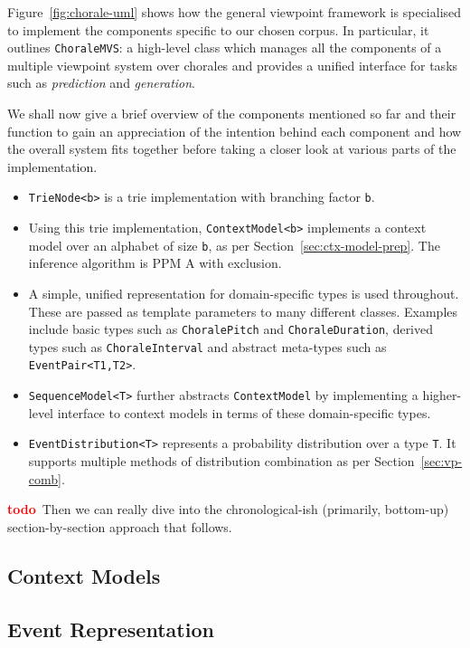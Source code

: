 \documentclass[12pt,a4paper,twoside,openright]{report}
\newcommand{\todo}{\textcolor{red}{\textbf{todo}~}}
\begin{document}
Figure~\ref{fig:chorale-uml} shows how the general viewpoint framework is
specialised to implement the components specific to our chosen corpus. In
particular, it outlines \texttt{ChoraleMVS}: a high-level class which manages
all the components of a multiple viewpoint system over chorales and provides a
unified interface for tasks such as \emph{prediction} and \emph{generation}.

We shall now give a brief overview of the components mentioned so far and their
function to gain an appreciation of the intention behind each component and how
the overall system fits together before taking a closer look at various parts of
the implementation.

\begin{itemize}
  \item \texttt{TrieNode<b>} is a trie implementation with branching factor
    \texttt{b}.
  \item Using this trie implementation, \texttt{ContextModel<b>} implements a
    context model over an alphabet of size \texttt{b}, as per
    Section~\ref{sec:ctx-model-prep}. The inference algorithm is PPM A with
    exclusion.
  \item A simple, unified representation for domain-specific types is used
    throughout.  These are passed as template parameters to many different
    classes. Examples include basic types such as \texttt{ChoralePitch} and
    \texttt{ChoraleDuration}, derived types such as \texttt{ChoraleInterval} and
    abstract meta-types such as \texttt{EventPair<T1,T2>}.
    
  \item \texttt{SequenceModel<T>} further abstracts \texttt{ContextModel} by
    implementing a higher-level interface to context models in terms of these
    domain-specific types.
  \item \texttt{EventDistribution<T>} represents a probability distribution over
    a type \texttt{T}. It supports multiple methods of distribution combination
    as per Section~\ref{sec:vp-comb}.
\end{itemize}

\todo Then we can really dive into the chronological-ish (primarily, bottom-up)
section-by-section approach that follows.

\subsection{Context Models}

\subsection{Event Representation}
\end{document}

